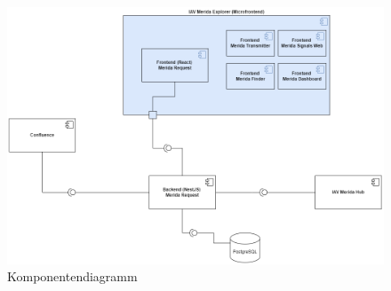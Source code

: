 \begin{figure}[H]
    \centering
    \includegraphics[scale=.4]{media/Komponentendiagramm}
    \caption{Komponentendiagramm}
    \label{fig:Komponentendiagramm}
\end{figure}
\label{chap:kapitel5}
